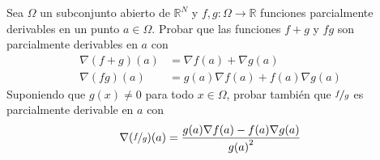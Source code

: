 \begin{ejercicio}
    Sea $\Omega$ un subconjunto abierto de $\mathbb{R}^N$ y $f,g:\Omega\to\mathbb{R}$ funciones parcialmente derivables en un punto $a\in \Omega$. Probar que las funciones $f+g$ y $fg$ son parcialmente derivables en $a$ con
    \begin{align*}
        \nabla (f+g)(a) &= \nabla f(a) + \nabla g(a) \\
        \nabla(fg)(a) &= g(a)\nabla f(a) + f(a) \nabla g(a)
    \end{align*}
    Suponiendo que $g(x)\neq 0$ para todo $x\in \Omega$, probar también que $\nicefrac{f}{g}$ es parcialmente derivable en $a$ con
    \begin{equation*}
        \nabla(\nicefrac{f}{g})(a) = \dfrac{g(a) \nabla f(a) - f(a) \nabla g(a)}{{g(a)}^{2}}
    \end{equation*}


\end{ejercicio}
